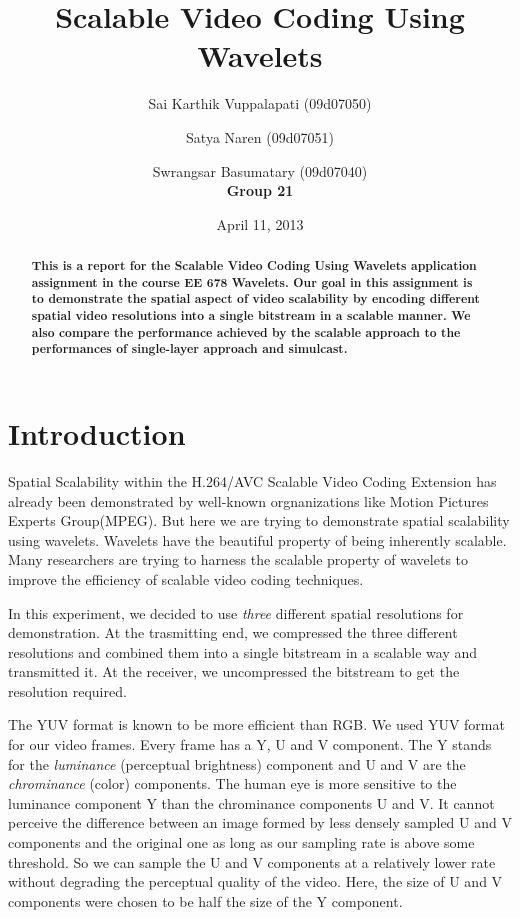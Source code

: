 \documentclass[10pt,twocolumn]{article}
\title{Scalable Video Coding Using Wavelets}
\author{Sai Karthik Vuppalapati (09d07050) \\
\and Satya Naren (09d07051) \\
\and Swrangsar Basumatary (09d07040) \\
\textbf{Group 21}}
\date{April 11, 2013}
\begin{document}
\maketitle

\begin{abstract}
    \textbf{This is a report for the Scalable Video Coding Using Wavelets application assignment in the course EE 678 Wavelets. Our goal in this assignment is to demonstrate the spatial aspect of video scalability by encoding different spatial video resolutions into a single bitstream in a scalable manner. We also compare the performance achieved by the scalable approach to the performances of single-layer approach and simulcast.}
\end{abstract}

\section{Introduction}

Spatial Scalability within the H.264/AVC Scalable Video Coding Extension has already been demonstrated by well-known orgnanizations like Motion Pictures Experts Group(MPEG)\cite{segall2007}. But here we are trying to demonstrate spatial scalability using wavelets\cite{daubechies1990, daubechies1996}. Wavelets have the beautiful property of being inherently scalable. Many researchers are trying to harness the scalable property of wavelets to improve the efficiency of scalable video coding techniques\cite{signoroni2007}.

In this experiment, we decided to use \emph{three} different spatial resolutions for demonstration. At the trasmitting end, we compressed the three different resolutions and combined them into a single bitstream in a scalable way and transmitted it. At the receiver, we uncompressed the bitstream to get the resolution required.

The YUV format is known to be more efficient than RGB. We used YUV format for our video frames. Every frame has a Y, U and V component. The Y stands for the \emph{luminance} (perceptual brightness) component and U and V are the \emph{chrominance} (color) components.  The human eye is more sensitive to the luminance component Y than the chrominance components U and V. It cannot perceive the difference between an image formed by less densely sampled U and V components and the original one as long as our sampling rate is above some threshold. So we can sample the U and V components at a relatively lower rate without degrading the perceptual quality of the video. Here, the size of U and V components were chosen to be half the size of the Y component.
\end{document}
